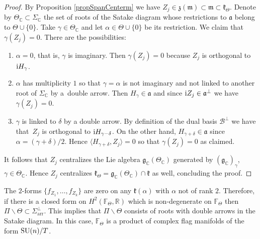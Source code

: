 \documentclass[10pt,a4paper]{amsart}
\numberwithin{equation}{section}
\begin{document}
\begin{proof}By Proposition \ref{propSpanCenterm} we have $Z_{j}\in \mathfrak{z} ( \mathfrak{m}) \subset \mathfrak{m}\subset \mathfrak{k}_{\Theta }$. Denote by $\Theta _{\mathbb{C}}\subset \Sigma _{\mathbb{C}}$ the set of
roots of the Satake diagram whose restrictions to $\mathfrak{a}$ belong to $\Theta \cup \{0\}$. Take $\gamma \in \Theta _{\mathbb{C}}$ and let $\alpha \in \Theta \cup \{0\}$ be its restriction. We claim that $\gamma (Z_{j}) =0$. There are the possibilities:
\begin{enumerate}\itemsep=0pt
\item $\alpha =0$, that is, $\gamma $ is imaginary. Then $\gamma ( Z_{j}) =0$ because $Z_{j}$ is orthogonal to ${\rm i}H_{\gamma }$.

\item $\alpha $ has multiplicity $1$ so that $\gamma =\alpha $ is not imaginary and not linked to another root of $\Sigma _{\mathbb{C}}$ by a~double arrow. Then $H_{\gamma }\in \mathfrak{a}$ and since ${\rm i}Z_{j}\in
\mathfrak{a}^{\bot }$ we have $\gamma ( Z_{j}) =0$.

\item $\gamma $ is linked to $\delta $ by a double arrow. By definition of the dual basis $\mathcal{B}^{\bot}$ we have that~$Z_{j}$ is orthogonal to ${\rm i}H_{\gamma -\delta }$. On the other hand, $H_{\gamma +\delta }\in \mathfrak{a}$ since $\alpha = ( \gamma +\delta ) /2$. Hence $\langle H_{\gamma +\delta },Z_{j}\rangle =0$ so that $\gamma ( Z_{j}) =0$ as claimed.
\end{enumerate}

It follows that $Z_{j}$ centralizes the Lie algebra $\mathfrak{g}_{\mathbb{C}} ( \Theta _{\mathbb{C}} ) $ generated by $ ( \mathfrak{g}_{\mathbb{C}} ) _{\gamma }$, $\gamma \in \Theta _{\mathbb{C}}$. Hence $Z_{j}$ centralizes $\mathfrak{k}_{\Theta }=\mathfrak{g}_{\mathbb{C}} (\Theta _{\mathbb{C}}) \cap \mathfrak{k}$ as well, concluding the proof.
\end{proof}

The $2$-forms $\{f_{Z_{1}},\ldots,f_{Z_{k}}\}$ are zero on any $\mathfrak{k}(\alpha )$ with $\alpha $ not of rank $2$. Therefore, if there is a closed form on $H^{2}(\mathbb{F}_{\Theta },\mathbb{R})$ which is non-degenerate on $\mathbb{F}_{\Theta }$ then $\Pi \backslash \Theta \subset \Sigma _{\mathrm{arr}}^{\bot }$. This implies that $\Pi \backslash \Theta $ consists of roots with double arrows in the Satake diagram. In this case, $\mathbb{F}_{\Theta } $ is a product of complex flag manifolds of the form ${\rm SU}(n)/T$.
\end{document}
